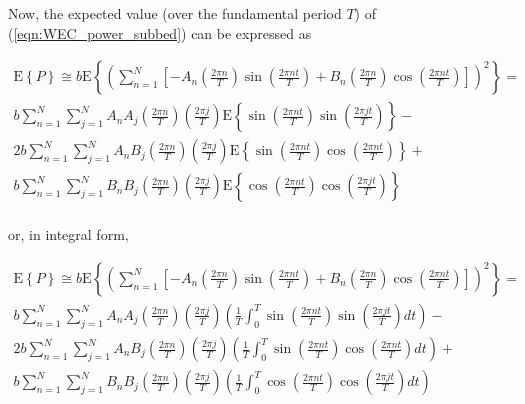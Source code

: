 \noindent Now, the expected value (over the fundamental period $T$) of (\ref{eqn:WEC_power_subbed}) can be expressed as

\begin{multline}
	\textrm{E}\left\{P\right\} \cong b\textrm{E}\left\{\left(\sum_{n=1}^{N} \left[-A_n\left(\frac{2\pi n}{T}\right)\sin\left(\frac{2\pi nt}{T}\right) + B_n\left(\frac{2\pi n}{T}\right)\cos\left(\frac{2\pi nt}{T}\right)\right]\right)^2\right\} =\\
	b\sum_{n=1}^{N}\sum_{j=1}^{N}A_nA_j\left(\frac{2\pi n}{T}\right)\left(\frac{2\pi j}{T}\right)\textrm{E}\left\{\sin\left(\frac{2\pi nt}{T}\right)\sin\left(\frac{2\pi jt}{T}\right)\right\} -\\
	2b\sum_{n=1}^{N}\sum_{j=1}^{N}A_nB_j\left(\frac{2\pi n}{T}\right)\left(\frac{2\pi j}{T}\right)\textrm{E}\left\{\sin\left(\frac{2\pi nt}{T}\right)\cos\left(\frac{2\pi nt}{T}\right)\right\} +\\
	b\sum_{n=1}^{N}\sum_{j=1}^{N}B_nB_j\left(\frac{2\pi n}{T}\right)\left(\frac{2\pi j}{T}\right)\textrm{E}\left\{\cos\left(\frac{2\pi nt}{T}\right)\cos\left(\frac{2\pi jt}{T}\right)\right\} \\
	\label{eqn:WEC_power_subbed_expectation}
\end{multline}

\noindent or, in integral form,

\begin{multline}
	\textrm{E}\left\{P\right\} \cong b\textrm{E}\left\{\left(\sum_{n=1}^{N} \left[-A_n\left(\frac{2\pi n}{T}\right)\sin\left(\frac{2\pi nt}{T}\right) + B_n\left(\frac{2\pi n}{T}\right)\cos\left(\frac{2\pi nt}{T}\right)\right]\right)^2\right\} =\\
	b\sum_{n=1}^{N}\sum_{j=1}^{N}A_nA_j\left(\frac{2\pi n}{T}\right)\left(\frac{2\pi j}{T}\right)\left(\frac{1}{T}\int_{0}^{T}\sin\left(\frac{2\pi nt}{T}\right)\sin\left(\frac{2\pi jt}{T}\right)dt\right) -\\
	2b\sum_{n=1}^{N}\sum_{j=1}^{N}A_nB_j\left(\frac{2\pi n}{T}\right)\left(\frac{2\pi j}{T}\right)\left(\frac{1}{T}\int_{0}^{T}\sin\left(\frac{2\pi nt}{T}\right)\cos\left(\frac{2\pi nt}{T}\right)dt\right) +\\
	b\sum_{n=1}^{N}\sum_{j=1}^{N}B_nB_j\left(\frac{2\pi n}{T}\right)\left(\frac{2\pi j}{T}\right)\left(\frac{1}{T}\int_{0}^{T}\cos\left(\frac{2\pi nt}{T}\right)\cos\left(\frac{2\pi jt}{T}\right)dt\right) \\
	\label{eqn:WEC_power_subbed_expectation_integral}
\end{multline}

